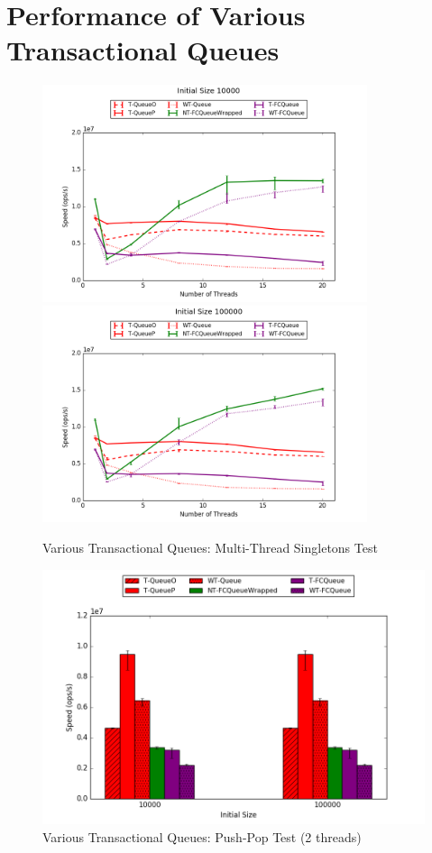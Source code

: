 \section{Performance of Various Transactional Queues}
\begin{figure}[H]
    \centering
    \includegraphics[width=0.85\textwidth]{fcqueues/allQ:RandSingleOps10000.png}
    \vspace{20pt}
    \includegraphics[width=0.85\textwidth]{fcqueues/allQ:RandSingleOps100000.png}
    \caption{Various Transactional Queues: Multi-Thread Singletons Test}
\end{figure}
\begin{figure}[H]
    \centering
    \includegraphics[width=\textwidth]{fcqueues/allQ:PushPop.png}
    \caption{Various Transactional Queues: Push-Pop Test (2 threads)}
\end{figure}

